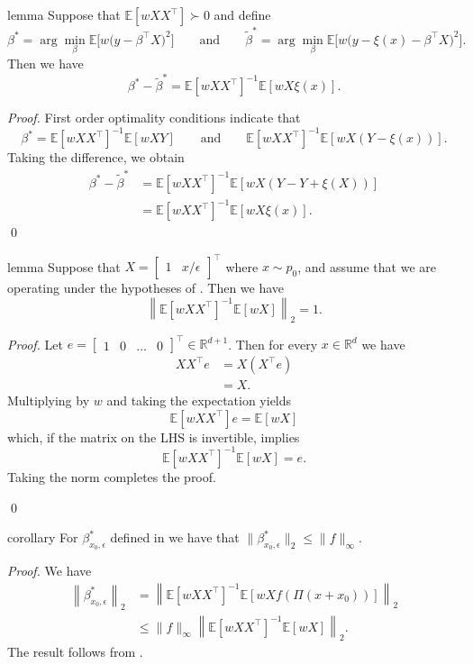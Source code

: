 \documentclass[11pt]{article}
\begin{document}
\begin{restatable}[Perturbation]{lemma}{} \label{lemma: perturbation}
    Suppose that $\mathbb{E}[wXX^{\top}] \succ 0$ and define  
    \[\beta^* = \arg\min_{\beta}\mathbb{E}\big[w\big(y - \beta^{\top}X\big)^2\big] \qquad \text{and} \qquad \tilde{\beta}^* = \arg\min_{\beta}\mathbb{E}\big[w\big(y - \xi(x) - \beta^{\top}X\big)^2\big].\]
    Then we have
    \[\beta^* - \tilde{\beta}^* = \mathbb{E}[wXX^{\top}]^{-1}\mathbb{E}[wX\xi(x)].\]
\end{restatable}
\noindent \textit{Proof.} First order optimality conditions indicate that 
\[\beta^* = \mathbb{E}[wXX^{\top}]^{-1}\mathbb{E}[wXY] \qquad \text{and} \qquad \mathbb{E}[wXX^{\top}]^{-1}\mathbb{E}[wX(Y - \xi(x))].\]
Taking the difference, we obtain
\begin{align*}
    \beta^* - \tilde{\beta}^* &= \mathbb{E}[wXX^{\top}]^{-1}\mathbb{E}[wX(Y -  Y + \xi(X) )] \\
    &= \mathbb{E}[wXX^{\top}]^{-1}\mathbb{E}[wX\xi(x)].
\end{align*}
\qed{}


\begin{restatable}{lemma}{} \label{lemma: pnorm bound} Suppose that $X = \begin{bmatrix}
    1 & x/\epsilon
\end{bmatrix}^{\top}$ where $x \sim p_0$, and assume that we are operating under the hypotheses of . Then we have
\begin{equation}
   \left\|\mathbb{E}[wXX^{\top}]^{-1}\mathbb{E}[wX]\right\|_2 =  1.
\end{equation}
\end{restatable}
\noindent \textit{Proof.} Let $e = \begin{bmatrix}
    1 & 0 & \dots & 0
\end{bmatrix}^{\top} \in \mathbb{R}^{d+1}$. Then for every $x \in \mathbb{R}^d$ we have
\begin{align*}
    XX^{\top}e &= X(X^{\top}e) \\
    &= X.
\end{align*}
Multiplying by $w$ and taking the expectation yields
\[\mathbb{E}[wXX^{\top}]e = \mathbb{E}[wX]\]
which, if the matrix on the LHS is invertible, implies
\[\mathbb{E}[wXX^{\top}]^{-1}\mathbb{E}[wX] = e.\]
Taking the norm completes the proof.

\qed{}

\begin{restatable}{corollary}{} \label{corollary: population beta norm bound}
For $\beta^*_{x_0, \epsilon}$ defined in  we have that $\|\beta^*_{x_0, \epsilon}\|_2 \leq \|f\|_{\infty}$.     
\end{restatable}
\noindent \textit{Proof.} We have
\begin{align*}
    \left\|\beta^*_{x_0, \epsilon}\right\|_2 &= \left\|\mathbb{E}\left[wXX^{\top}\right]^{-1}\mathbb{E}\left[wXf(\Pi(x+x_0))\right]\right\|_2 \\
    &\leq \|f\|_\infty \left\|\mathbb{E}\left[wXX^{\top}\right]^{-1}\mathbb{E}\left[wX\right]\right\|_2.
\end{align*}
The result follows from .
\end{document}
